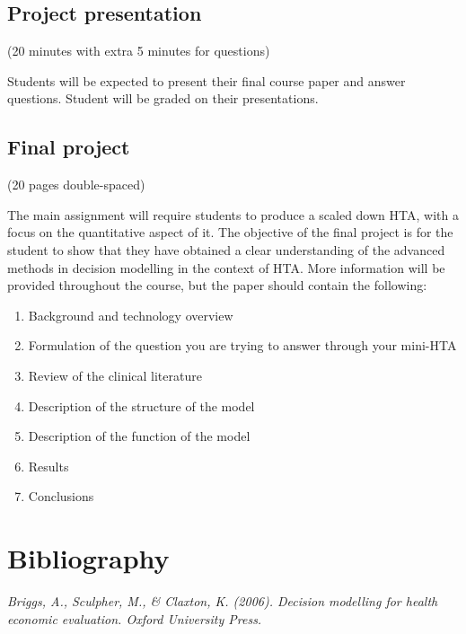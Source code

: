 \documentclass[
]{book}
\providecommand{\tightlist}{%
  \setlength{\itemsep}{0pt}\setlength{\parskip}{0pt}}
\begin{document}
\hypertarget{project-presentation}{%
\subsection*{Project presentation}\label{project-presentation}}

(20 minutes with extra 5 minutes for questions)

Students will be expected to present their final course paper and answer questions. Student will be graded on their presentations.

\hypertarget{final-project}{%
\subsection*{Final project}\label{final-project}}

(20 pages double-spaced)

The main assignment will require students to produce a scaled down HTA, with a focus on the quantitative aspect of it. The objective of the final project is for the student to show that they have obtained a clear understanding of the advanced methods in decision modelling in the context of HTA. More information will be provided throughout the course, but the paper should contain the following:

\begin{enumerate}
\def\labelenumi{\alph{enumi})}
\tightlist
\item
  Background and technology overview
\item
  Formulation of the question you are trying to answer through your mini-HTA
\item
  Review of the clinical literature
\item
  Description of the structure of the model
\item
  Description of the function of the model
\item
  Results
\item
  Conclusions
\end{enumerate}

\hypertarget{bibliography}{%
\section*{Bibliography}\label{bibliography}}

\emph{Briggs, A., Sculpher, M., \& Claxton, K. (2006). Decision modelling for health economic evaluation. Oxford University Press.}
\end{document}
